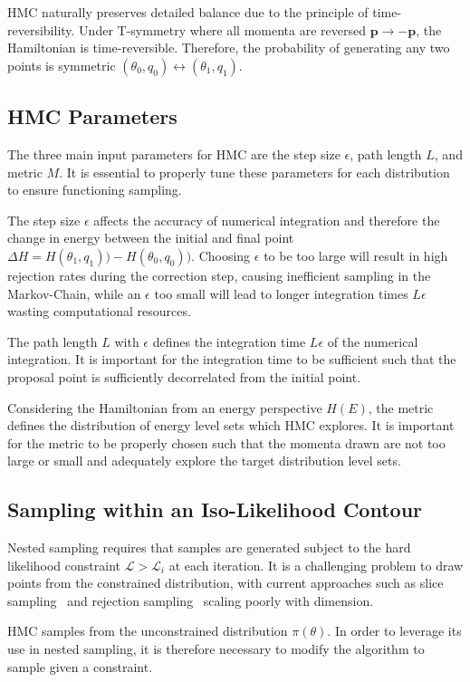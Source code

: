 \documentclass[11pt]{article}
\begin{document}
    HMC naturally preserves detailed balance due to the principle of time-reversibility.
    Under T-symmetry where all momenta are reversed $\mathbf{p} \rightarrow -\mathbf{p}$, the Hamiltonian is
    time-reversible.
    Therefore, the probability of generating any two points is symmetric $(\theta_0, q_0) \leftrightarrow (\theta_1, q_1)$.

\subsection{HMC Parameters}\label{subsec:hmc_params}
    The three main input parameters for HMC are the step size $\epsilon$, path length $L$, and metric $M$.
    It is essential to properly tune these parameters for each distribution to ensure functioning sampling.

    The step size $\epsilon$ affects the accuracy of numerical integration and therefore the change in energy between the initial
    and final point $\Delta H = H(\theta_1, q_1)) - H(\theta_0, q_0))$.
    Choosing $\epsilon$ to be too large will result in high rejection rates during the correction step, causing
    inefficient sampling in the Markov-Chain, while an $\epsilon$ too small will lead to longer integration
    times $L\epsilon$ wasting computational resources.

    The path length $L$ with $\epsilon$ defines the integration time $L\epsilon$ of the numerical integration.
    It is important for the integration time to be sufficient such that the proposal point is sufficiently decorrelated
    from the initial point.

    Considering the Hamiltonian from an energy perspective $H(E)$, the metric defines the distribution of energy level
    sets which HMC explores.
    It is important for the metric to be properly chosen such that the momenta drawn are not too large or small and
    adequately explore the target distribution level sets.

\subsection{Sampling within an Iso-Likelihood Contour}\label{subsec:isolikelood_sampling}
    Nested sampling requires that samples are generated subject to the hard likelihood constraint
    $\mathcal{L} > \mathcal{L}_i$ at each iteration.
    It is a challenging problem to draw points from the constrained distribution, with current approaches such as
    slice sampling~\cite{neal2003slice} and rejection sampling~\cite{Feroz_2009} scaling poorly with dimension.

    HMC samples from the unconstrained distribution $\pi(\theta)$.
    In order to leverage its use in nested sampling, it is therefore necessary to modify the algorithm to sample
    given a constraint.
\end{document}
